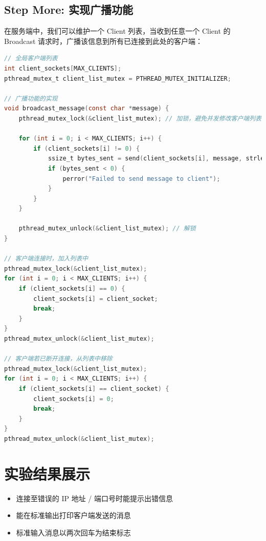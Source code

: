 \documentclass[14pt,a4paper,UTF8,twoside]{article}
\begin{document}
\subsection{Step More: 实现广播功能}

在服务端中，我们可以维护一个 Client 列表，当收到任意一个 Client 的 Broadcast 请求时，广播该信息到所有已连接到此处的客户端：

\begin{lstlisting}[language=C, title={Server Broadcast}]
// 全局客户端列表
int client_sockets[MAX_CLIENTS];
pthread_mutex_t client_list_mutex = PTHREAD_MUTEX_INITIALIZER;

// 广播功能的实现
void broadcast_message(const char *message) {
    pthread_mutex_lock(&client_list_mutex); // 加锁，避免并发修改客户端列表

    for (int i = 0; i < MAX_CLIENTS; i++) {
        if (client_sockets[i] != 0) {
            ssize_t bytes_sent = send(client_sockets[i], message, strlen(message), 0);
            if (bytes_sent < 0) {
                perror("Failed to send message to client");
            }
        }
    }

    pthread_mutex_unlock(&client_list_mutex); // 解锁
}

// 客户端连接时，加入列表中 
pthread_mutex_lock(&client_list_mutex);
for (int i = 0; i < MAX_CLIENTS; i++) {
    if (client_sockets[i] == 0) {
        client_sockets[i] = client_socket;
        break;
    }
}
pthread_mutex_unlock(&client_list_mutex);

// 客户端若已断开连接，从列表中移除
pthread_mutex_lock(&client_list_mutex);
for (int i = 0; i < MAX_CLIENTS; i++) {
    if (client_sockets[i] == client_socket) {
        client_sockets[i] = 0;
        break;
    }
}
pthread_mutex_unlock(&client_list_mutex);

\end{lstlisting}

\section{实验结果展示}

\begin{ctt}
    \begin{itemize}
    \item 连接至错误的 IP 地址 / 端口号时能提示出错信息 
    \item 能在标准输出打印客户端发送的消息
    \item 标准输入消息以两次回车为结束标志
    \end{itemize}
\end{ctt}
\end{document}
